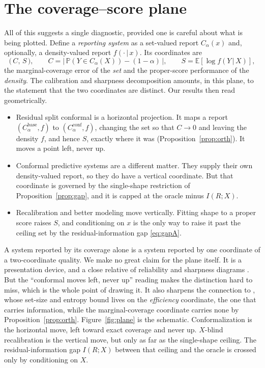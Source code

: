 \documentclass[11pt]{article}
\theoremstyle{definition}
\newcommand{\E}{\mathbb{E}}
\renewcommand{\Pr}{\mathbb{P}}
\newcommand{\given}{\,\vert\,}
\begin{document}
\section{The coverage--score plane}\label{sec:plane}

All of this suggests a single diagnostic, provided one is careful about what is being
plotted. Define a \emph{reporting system} as a set-valued report $C_\alpha(x)$ and,
optionally, a density-valued report $f(\cdot\given x)$. Its coordinates are
\begin{equation}
  \big(\,C,\,S\,\big),\qquad
  C=\big|\,\Pr(Y\in C_\alpha(X))-(1-\alpha)\,\big|,\qquad
  S=\E[\log f(Y\given X)],
\end{equation}
the marginal-coverage error of the \emph{set} and the proper-score performance of the
\emph{density}. The calibration and sharpness decomposition
\citep{gneiting2007probabilistic} amounts, in this plane, to the statement that the two
coordinates are distinct. Our results then read geometrically.
\begin{itemize}
  \item Residual split conformal is a horizontal projection. It maps a report
  $(C_\alpha^{\text{base}},f)$ to $(C_\alpha^{\text{conf}},f)$, changing the set so that
  $C\to 0$ and leaving the density $f$, and hence $S$, exactly where it was
  (Proposition~\ref{prop:orth}). It moves a point left, never up.
  \item Conformal predictive systems are a different matter. They supply their own
  density-valued report, so they do have a vertical coordinate. But that coordinate is
  governed by the single-shape restriction of Proposition~\ref{prop:gap}, and it is capped
  at the oracle minus $I(R;X)$.
  \item Recalibration and better modeling move vertically. Fitting shape to a proper score
  raises $S$, and conditioning on $x$ is the only way to raise it past the ceiling set by
  the residual-information gap \eqref{eq:gapA}.
\end{itemize}
A system reported by its coverage alone is a system reported by one coordinate of a
two-coordinate quality. We make no great claim for the plane itself. It is a presentation
device, and a close relative of reliability and sharpness diagrams
\citep{gneiting2007probabilistic}. But the ``conformal moves left, never up'' reading makes
the distinction hard to miss, which is the whole point of drawing it. It also sharpens the
connection to \citet{correia2024information}, whose set-size and entropy bound lives on the
\emph{efficiency} coordinate, the one that carries information, while the marginal-coverage
coordinate carries none by Proposition~\ref{prop:orth}. Figure~\ref{fig:plane} is the
schematic. Conformalization is the horizontal move, left toward exact coverage and never up.
$X$-blind recalibration is the vertical move, but only as far as the single-shape ceiling.
The residual-information gap $I(R;X)$ between that ceiling and the oracle is crossed only by
conditioning on $X$.
\end{document}

